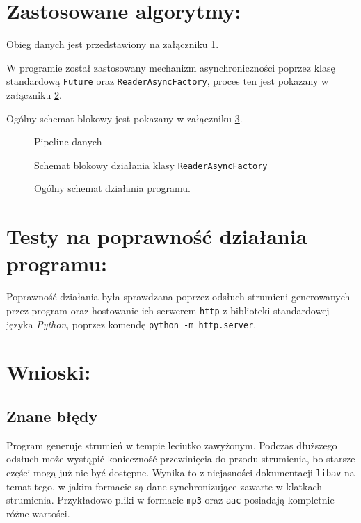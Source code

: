 \documentclass[a4paper,12pt]{article}
\begin{document}
\section{Zastosowane algorytmy:}

Obieg danych jest przedstawiony na załączniku \ref{rys:pipeline}.

W programie został zastosowany mechanizm asynchroniczności poprzez klasę
standardową \texttt{Future} oraz \texttt{ReaderAsyncFactory}, proces ten jest
pokazany w załączniku \ref{rys:reader}. 

Ogólny schemat blokowy jest pokazany w załączniku \ref{rys:program}.

\begin{figure}[p]
    \resizebox{.3\textwidth}{!}{%
    }
    \centering
    \caption{Pipeline danych}
    \label{rys:pipeline}
\end{figure}

\begin{figure}[p]
    \resizebox{.7\textwidth}{!}{%
    }
    \centering
    \caption{Schemat blokowy działania klasy \texttt{ReaderAsyncFactory}}
    \label{rys:reader}
\end{figure}

\begin{figure}[p]
    \resizebox{.54\textwidth}{!}{%
    }
    \centering
    \caption{Ogólny schemat działania programu.}
    \label{rys:program}
\end{figure}

\section{Testy na poprawność działania programu:}

Poprawność działania była sprawdzana poprzez odsłuch strumieni generowanych
przez program oraz hostowanie ich serwerem \texttt{http} z biblioteki
standardowej języka \emph{Python}, poprzez komendę \texttt{python -m
http.server}.

\section{Wnioski:}

\subsection{Znane błędy}

Program generuje strumień w tempie leciutko zawyżonym. Podczas dłuższego odsłuch
może wystąpić konieczność przewinięcia do przodu strumienia, bo starsze części
mogą już nie być dostępne. Wynika to z niejasności dokumentacji \texttt{libav}
na temat tego, w jakim formacie są dane synchronizujące zawarte w klatkach
strumienia. Przykładowo pliki w formacie \texttt{mp3} oraz \texttt{aac}
posiadają kompletnie różne wartości. 
\end{document}
